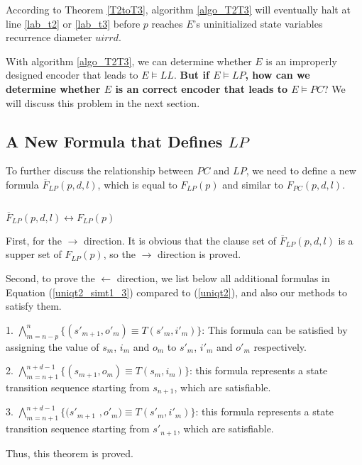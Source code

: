 \documentclass[journal]{IEEEtran}
\begin{document}
According to Theorem \ref{T2toT3},
algorithm \ref{algo_T2T3} will eventually halt at line \ref{lab_t2} or \ref{lab_t3} before $p$ reaches $E$'s uninitialized state variables recurrence diameter $uirrd$.

With algorithm \ref{algo_T2T3},
we can determine whether $E$ is an improperly designed encoder that leads to $E\vDash LL$.
\textbf{But if $E\vDash LP$, how can we determine whether $E$ is an correct encoder that leads to $E\vDash PC$}?
We will discuss this problem in the next section.

\subsection{A New Formula that Defines $LP$}
To further discuss the relationship between $PC$ and $LP$,
we need to define a new formula $\overline{F}_{LP}(p,d,l)$,
which is equal to $F_{LP}(p)$ and
similar to $F_{PC}(p,d,l)$.

\begin{equation}\label{uniqt2_simt1_3}
\end{equation}

\begin{theorem}\label{t2t2new}
$\overline{F}_{LP}(p,d,l)\leftrightarrow F_{LP}(p)$
\end{theorem}
\begin{IEEEproof}
First,
for the $\to$ direction.
It is obvious that the clause set of $\overline{F}_{LP}(p,d,l)$ is a supper set of $F_{LP}(p)$,
so the $\to$ direction is proved.

Second,
to prove the $\gets$ direction,
we list below all additional formulas in Equation (\ref{uniqt2_simt1_3}) compared to (\ref{uniqt2}),
and also our methods to satisfy them.

1. $\bigwedge_{m=n-p}^{n}\{(s'_{m+1},o'_m)\equiv T(s'_m,i'_m)\}$: This formula can be satisfied by assigning the value of $s_m$, $i_m$ and $o_m$ to $s'_m$, $i'_m$ and $o'_m$ respectively.

2. $\bigwedge_{m=n+1}^{n+d-1}\{(s_{m+1},o_m)\equiv T(s_m,i_m)\}$:
this formula represents a state transition sequence starting from $s_{n+1}$,
which are satisfiable.

3. $\bigwedge_{m=n+1}^{n+d-1}\{(s'_{m+1}$ $,o'_m)\equiv T(s'_m,i'_m)\}$:
this formula represents a state transition sequence starting from $s'_{n+1}$,
which are satisfiable.

Thus, this theorem is proved.
\end{IEEEproof}
\end{document}
